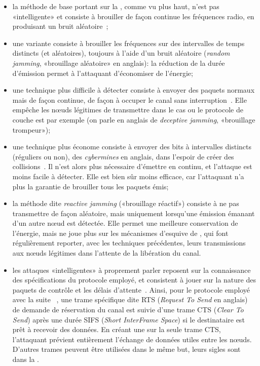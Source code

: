 \begin{itemize}
    \item la méthode de base portant sur la , comme vu plus haut, n'est pas «intelligente» et consiste à brouiller de façon continue les fréquences radio, en produisant un bruit aléatoire~\cite{PI11};
    \item une variante consiste à brouiller les fréquences sur des intervalles de temps distincts (et aléatoires), toujours à l'aide d'un bruit aléatoire (\textit{random jamming}, «brouillage aléatoire» en anglais): la réduction de la durée d'émission permet à l'attaquant d'économiser de l'énergie;
    \item une technique plus difficile à détecter consiste à envoyer des paquets normaux mais de façon continue, de façon à occuper le canal sans interruption~\cite{PI11}. Elle empêche les nœuds légitimes de transmettre dans le cas ou le protocole de couche \mac{} est \csmaca par exemple (on parle en anglais de \textit{deceptive jamming}, «brouillage trompeur»);
    \item une technique plus économe consiste à envoyer des bits à intervalles distincts (réguliers ou non), des \textit{cybermines} en anglais, dans l'espoir de créer des collisions~\cite{PI11}. Il n'est alors plus nécessaire d'émettre en continu, et l'attaque est moins facile à détecter. Elle est bien sûr moins efficace, car l'attaquant n'a plus la garantie de brouiller tous les paquets émis;
    \item la méthode dite \textit{reactive jamming} («brouillage réactif») consiste à ne pas transmettre de façon aléatoire, mais uniquement lorsqu'une émission émanant d'un autre nœud est détectée\cite{PI11}. Elle permet une meilleure conservation de l'énergie, mais ne joue plus sur les mécanismes d'esquive de , qui font régulièrement reporter, avec les techniques précédentes, leurs transmissions aux nœuds légitimes dans l'attente de la libération du canal.
    \item les attaques «intelligentes» à proprement parler reposent sur la connaissance des spécifications du protocole \mac employé, et consistent à jouer sur la nature des paquets de contrôle et les délais d'attente~\cite{PI11}. Ainsi, pour le protocole \csmaca employé avec la suite \ieeee~\cite{ieee802.11}, une trame spécifique dite RTS (\textit{Request To Send} en anglais) de demande de réservation du canal est suivie d'une trame CTS (\textit{Clear To Send}) après une durée SIFS (\textit{Short InterFrame Space}) si le destinataire est prêt à recevoir des données. En créant une  sur la seule trame CTS, l'attaquant prévient entièrement l'échange de données utiles entre les nœuds. D'autres trames peuvent être utilisées dans le même but, leurs sigles sont dans la .
\end{itemize}
